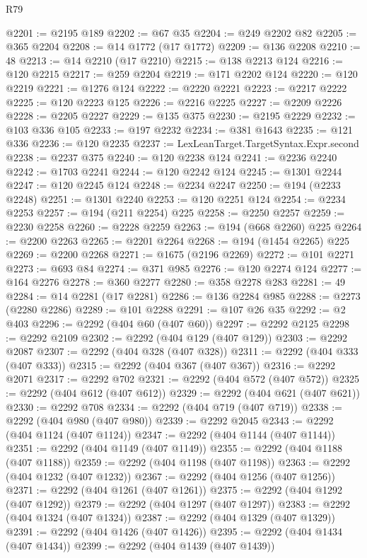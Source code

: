 \begin{lexlean}{R79}
\begin{coremodule}
@2201 := @2195 @189
@2202 := @67 @35
@2204 := @249 @2202 @82
@2205 := @365 @2204
@2208 := @14 @1772 (@17 @1772)
@2209 := @136 @2208
@2210 := 48
@2213 := @14 @2210 (@17 @2210)
@2215 := @138 @2213 @124
@2216 := @120 @2215
@2217 := @259 @2204
@2219 := @171 @2202 @124
@2220 := @120 @2219
@2221 := @1276 @124
@2222 := @2220 @2221
@2223 := @2217 @2222
@2225 := @120 @2223 @125
@2226 := @2216 @2225
@2227 := @2209 @2226
@2228 := @2205 @2227
@2229 := @135 @375
@2230 := @2195 @2229
@2232 := @103 @336 @105
@2233 := @197 @2232
@2234 := @381 @1643
@2235 := @121 @336
@2236 := @120 @2235
@2237 := LexLeanTarget.TargetSyntax.Expr.second
@2238 := @2237 @375
@2240 := @120 @2238 @124
@2241 := @2236 @2240
@2242 := @1703 @2241
@2244 := @120 @2242 @124
@2245 := @1301 @2244
@2247 := @120 @2245 @124
@2248 := @2234 @2247
@2250 := @194 (@2233 @2248)
@2251 := @1301 @2240
@2253 := @120 @2251 @124
@2254 := @2234 @2253
@2257 := @194 (@211 @2254) @225
@2258 := @2250 @2257
@2259 := @2230 @2258
@2260 := @2228 @2259
@2263 := @194 (@668 @2260) @225
@2264 := @2200 @2263
@2265 := @2201 @2264
@2268 := @194 (@1454 @2265) @225
@2269 := @2200 @2268
@2271 := @1675 (@2196 @2269)
@2272 := @101 @2271
@2273 := @693 @84
@2274 := @371 @985
@2276 := @120 @2274 @124
@2277 := @164 @2276
@2278 := @360 @2277
@2280 := @358 @2278 @283
@2281 := 49
@2284 := @14 @2281 (@17 @2281)
@2286 := @136 @2284 @985
@2288 := @2273 (@2280 @2286)
@2289 := @101 @2288
@2291 := @107 @26 @35
@2292 := @2 @403
@2296 := @2292 (@404 @60 (@407 @60))
@2297 := @2292 @2125
@2298 := @2292 @2109
@2302 := @2292 (@404 @129 (@407 @129))
@2303 := @2292 @2087
@2307 := @2292 (@404 @328 (@407 @328))
@2311 := @2292 (@404 @333 (@407 @333))
@2315 := @2292 (@404 @367 (@407 @367))
@2316 := @2292 @2071
@2317 := @2292 @702
@2321 := @2292 (@404 @572 (@407 @572))
@2325 := @2292 (@404 @612 (@407 @612))
@2329 := @2292 (@404 @621 (@407 @621))
@2330 := @2292 @708
@2334 := @2292 (@404 @719 (@407 @719))
@2338 := @2292 (@404 @980 (@407 @980))
@2339 := @2292 @2045
@2343 := @2292 (@404 @1124 (@407 @1124))
@2347 := @2292 (@404 @1144 (@407 @1144))
@2351 := @2292 (@404 @1149 (@407 @1149))
@2355 := @2292 (@404 @1188 (@407 @1188))
@2359 := @2292 (@404 @1198 (@407 @1198))
@2363 := @2292 (@404 @1232 (@407 @1232))
@2367 := @2292 (@404 @1256 (@407 @1256))
@2371 := @2292 (@404 @1261 (@407 @1261))
@2375 := @2292 (@404 @1292 (@407 @1292))
@2379 := @2292 (@404 @1297 (@407 @1297))
@2383 := @2292 (@404 @1324 (@407 @1324))
@2387 := @2292 (@404 @1329 (@407 @1329))
@2391 := @2292 (@404 @1426 (@407 @1426))
@2395 := @2292 (@404 @1434 (@407 @1434))
@2399 := @2292 (@404 @1439 (@407 @1439))

\end{coremodule}
\end{lexlean}
